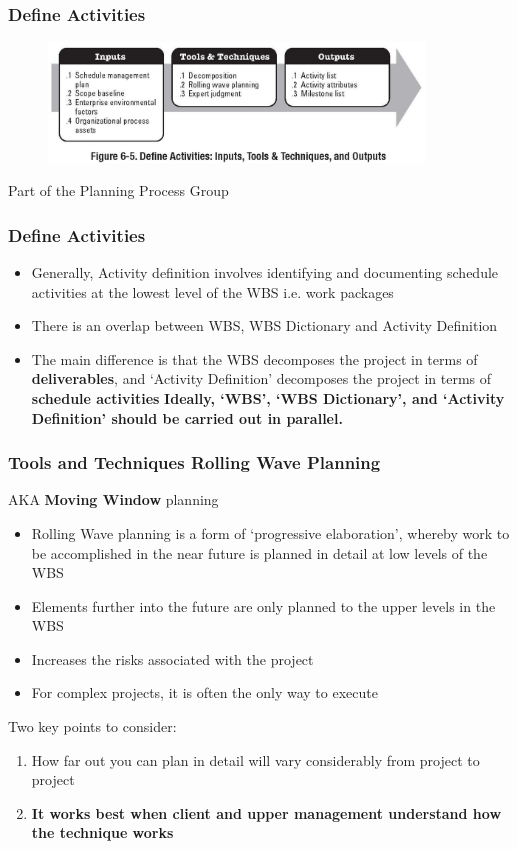 \begin{frame}
\frametitle{Define Activities}
\begin{figure}
	\centering
		\includegraphics[width = 10cm]{images/Fig6-5.jpg}
	\label{fig:6-5}
\end{figure}
Part of the Planning Process Group
\end{frame}




\begin{frame}
\frametitle{Define Activities}
\begin{itemize}
	\item Generally, Activity definition involves identifying and documenting schedule activities at the lowest level of the WBS  i.e. work packages
	\item There is an overlap between WBS, WBS Dictionary and Activity Definition
	\item The main difference is that the WBS decomposes the project in terms of \textbf{deliverables}, and `Activity Definition' decomposes the project in terms of \textbf{schedule activities}
\textbf{Ideally, `WBS', `WBS Dictionary', and `Activity Definition' should be carried out in parallel.}
\end{itemize}
\end{frame}




\begin{frame}
\frametitle{Tools and Techniques \hfill Rolling Wave Planning}
AKA \textbf{Moving Window} planning
\begin{itemize}
	\item Rolling Wave planning is a form of ‘progressive elaboration’, whereby work to be accomplished in the near future is planned in detail at low levels of the WBS
	\item Elements further into the future are only planned to the upper levels in the WBS 
	\item Increases the risks associated with the project
	\item For complex projects, it is often the only way to execute
\end{itemize}

Two key points to consider:
\begin{enumerate}
	\item How far out you can plan in detail will vary considerably from project to project
	\item \textbf{It works best when client and upper management understand how the technique works} 
\end{enumerate}
\end{frame}





